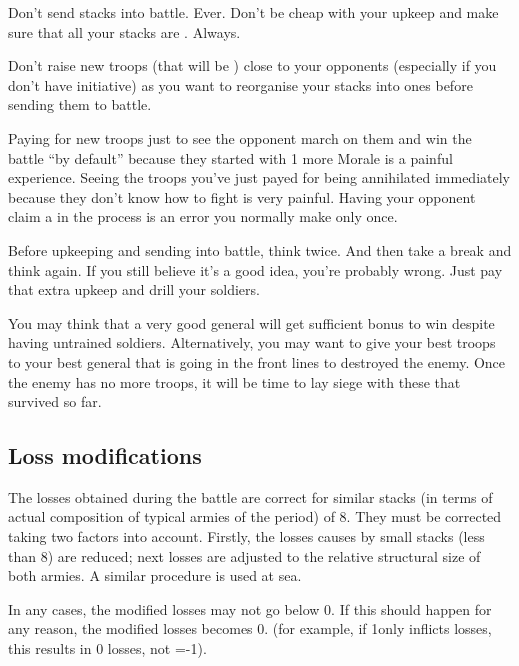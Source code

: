 \begin{playtip}
  Don't send  stacks into battle. Ever. Don't be cheap with
  your upkeep and make sure that all your stacks are . Always.

  Don't raise new troops (that will be ) close to your
  opponents (especially if you don't have initiative) as you want to
  reorganise your stacks into  ones before sending them to
  battle.

  Paying for new troops just to see the opponent march on them and win the
  battle ``by default'' because they started with 1 more Morale is a painful
  experience. Seeing the troops you've just payed for being annihilated
  immediately because they don't know how to fight is very painful. Having
  your opponent claim a  in the process is an error you
  normally make only once.

  Before upkeeping and sending  into battle, think twice. And
  then take a break and think again. If you still believe it's a good idea,
  you're probably wrong. Just pay that extra upkeep and drill your soldiers.

  You may think that a very good general will get sufficient bonus to win
  despite having untrained soldiers. Alternatively, you may want to give your
  best troops to your best general that is going in the front lines to
  destroyed the enemy. Once the enemy has no more troops, it will be time to
  lay siege with these  that survived so far.
\end{playtip}

\subsection{Loss modifications}
\label{chMilitary:Battle:Loss modifications}
The losses obtained during the battle are correct for similar stacks (in terms
of actual composition of typical armies of the period) of 8\LD. They must be
corrected taking two factors into account. Firstly, the losses causes by small
stacks (less than 8\LD) are reduced; next losses are adjusted to the relative
structural size of both armies. A similar procedure is used at sea.

In any cases, the modified losses may not go below 0. If this should happen
for any reason, the modified losses becomes 0. (for example, if 1\LD only
inflicts \texttu losses, this results in 0 losses, not =-1\texttd).

